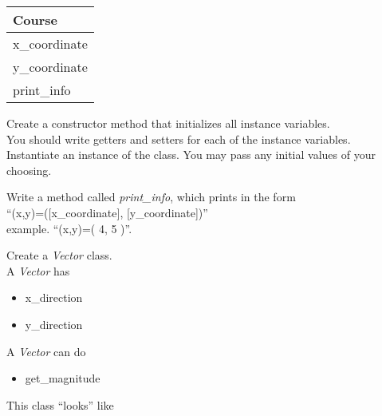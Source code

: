 \documentclass{article}
\newcommand{\tab}{\hspace*{0.25in}}
\begin{document}
\begin{enumerate}
\begin{minipage}{.4\textwidth}
		\vspace*{1em}
		\begin{tabular}{|l|}
			\hline Course\\ \hline
			x\_coordinate\\ y\_coordinate\\ \hline
			print\_info\\  \hline
		\end{tabular}
	\end{minipage}

	\vspace*{2ex}
	Create a constructor method that initializes all instance variables.\\
	You should write getters and setters for each of the instance variables.\\
	Instantiate an instance of the class. You may pass any initial values of your choosing.

	Write a method called \textit{print\_info}, which prints in the form \\
		\tab \tab \tab ``(x,y)=([x\_coordinate], [y\_coordinate])''\\
	example. ``(x,y)=( 4, 5 )''.\\




	\begin{minipage}{.6\textwidth}
	\item Create a \textit{Vector} class.\\
		A \textit{Vector} has
		\begin{itemize}
			\item x\_direction 
			\item y\_direction
		\end{itemize}
		
		A \textit{Vector} can do
		\begin{itemize}
			\item get\_magnitude
		\end{itemize}
	\end{minipage}
	\begin{minipage}{.4\textwidth}
		This class ``looks'' like 
				

\end{minipage}
\end{enumerate}
\end{document}
